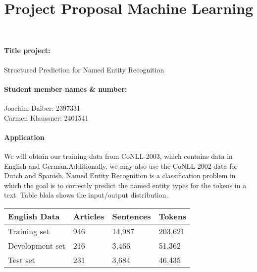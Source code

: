 \documentclass[a4paper,10pt]{article}
\title{Project Proposal Machine Learning}
\author{}
\date{}
\begin{document}
\maketitle

% 
% 


\paragraph{Title project:}
Structured Prediction for Named Entity Recognition

\paragraph{Student member names \& number:}

Joachim Daiber: 2397331\\
Carmen Klaussner: 2401541\\

\paragraph{Application}
We will obtain our training data from CoNLL-2003\cite{TjongKimSang:2003:ICS:1119176.1119195}, which contains
data in English and German.Additionally, we may also use the CoNLL-2002 data for Dutch and Spanish. 
Named Entity Recognition is a classification problem in which the goal is to correctly predict the named entity types for
the tokens in a text. Table blala shows the input/output distribution.



\begin{table}[h!]
\centering
 \begin{tabular}{l|l|l|l}
 \textbf{English Data}& Articles & Sentences & Tokens \\ \hline
 Training set &   946       &   14,987        &   203,621     \\
 Development set& 216        &  3,466         &    51,362     \\
 Test set       & 231        &   3,684        &     46,435    \\
  
 \end{tabular}
\end{table}
\end{document}
